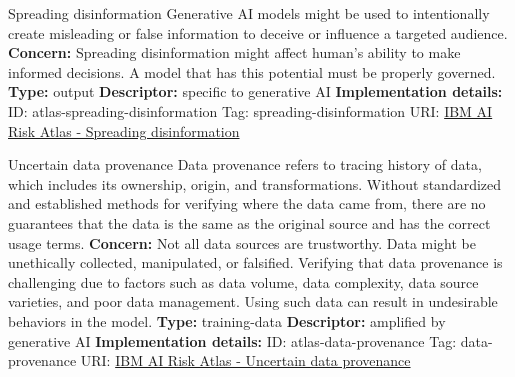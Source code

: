 \documentclass[a4paper,12pt]{article}
\begin{document}
\begin{definitionbox}{Spreading disinformation}
Generative AI models might be used to intentionally create misleading or false information to deceive or influence a targeted audience.\newline\newline
\textbf{Concern: }Spreading disinformation might affect human's ability to make informed decisions. A model that has this potential must be properly governed.\newline\newline
\textbf{Type: }output\newline
\textbf{Descriptor: }specific to generative AI \newline\newline
\textbf{Implementation details: } \newline
ID: atlas-spreading-disinformation \newline
Tag: spreading-disinformation \newline
URI:  \href{https://www.ibm.com/docs/en/watsonx/saas?topic=SSYOK8/wsj/ai-risk-atlas/spreading-disinformation.html}{IBM AI Risk Atlas - Spreading disinformation}\newline
\end{definitionbox}
\begin{definitionbox}{Uncertain data provenance}
Data provenance refers to tracing history of data, which includes its ownership, origin, and transformations. Without standardized and established methods for verifying where the data came from, there are no guarantees that the data is the same as the original source and has the correct usage terms.\newline\newline
\textbf{Concern: }Not all data sources are trustworthy. Data might be unethically collected, manipulated, or falsified. Verifying that data provenance is challenging due to factors such as data volume, data complexity, data source varieties, and poor data management. Using such data can result in undesirable behaviors in the model.\newline\newline
\textbf{Type: }training-data\newline
\textbf{Descriptor: }amplified by generative AI \newline\newline
\textbf{Implementation details: } \newline
ID: atlas-data-provenance \newline
Tag: data-provenance \newline
URI:  \href{https://www.ibm.com/docs/en/watsonx/saas?topic=SSYOK8/wsj/ai-risk-atlas/data-provenance.html}{IBM AI Risk Atlas - Uncertain data provenance}\newline
\end{definitionbox}
\end{document}
